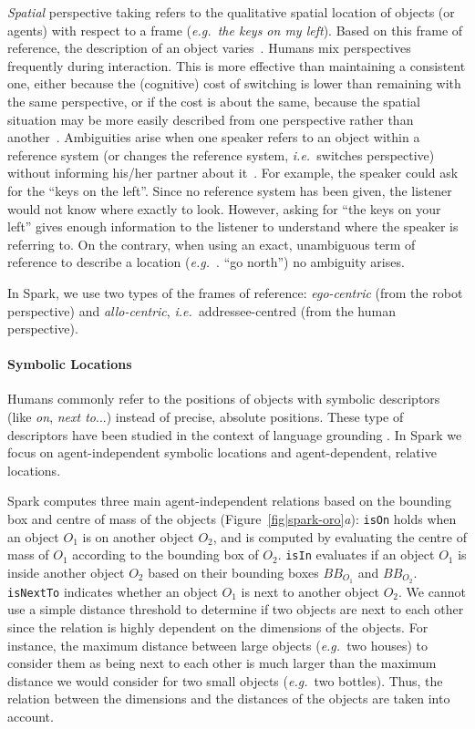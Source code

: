 \documentclass[preprint,3p,times]{elsarticle}
\newcommand{\concept}[1]{{\small \texttt{#1}}}
\newcommand{\ie}{{\textit{i.e.\ }}}
\newcommand{\eg}{{\textit{e.g.\ }}}
\begin{document}
\emph{Spatial} perspective taking refers to the qualitative spatial location of
objects (or agents) with respect to a frame (\eg \emph{the keys on my left}).
Based on this frame of reference, the description of an object
varies~\cite{Marin2008}. Humans mix perspectives frequently during interaction.
This is more effective than maintaining a consistent one, either because the
(cognitive) cost of switching is lower than remaining with the same
perspective, or if the cost is about the same, because the spatial situation
may be more easily described from one perspective rather than
another~\cite{Tversky1999}. Ambiguities arise when one speaker refers to an
object within a reference system (or changes the reference system, \ie switches
perspective) without informing his/her partner about it~\cite{Breazeal2006,
Ros2010}. For example, the speaker could ask for the ``keys on the left''.
Since no reference system has been given, the listener would not know where
exactly to look.  However, asking for ``the keys on your left'' gives enough
information to the listener to understand where the speaker is referring to. On
the contrary, when using an exact, unambiguous term of reference to describe a
location (\eg. ``go north'') no ambiguity arises.

In {\sc Spark}, we use two types of the frames of reference: \emph{ego-centric}
(from the robot perspective) and \emph{allo-centric}, \ie addressee-centred
(from the human perspective).

\paragraph{Symbolic Locations}

Humans commonly refer to the positions of objects with symbolic descriptors
(like \emph{on}, \emph{next to}...) instead of precise, absolute positions.
These type of descriptors have been studied in the context of language
grounding \cite{O'Keefe1999,Matuszek2010,Regier2001,Kelleher2006,Blisard2005}.
In {\sc Spark} we focus on agent-independent symbolic locations and agent-dependent,
relative locations.

{\sc Spark} computes three main agent-independent relations based on the
bounding box and centre of mass of the objects
(Figure~\ref{fig|spark-oro}\emph{a}): \concept{isOn} holds when an object $O_1$
is on another object $O_2$, and is computed by evaluating the centre of mass of
$O_1$ according to the bounding box of $O_2$.  \concept{isIn} evaluates if an
object $O_1$ is inside another object $O_2$ based on their bounding boxes
$BB_{O_1}$ and $BB_{O_2}$.  \concept{isNextTo} indicates whether an object $O_1$
is next to another object $O_2$. We cannot use a simple distance threshold to
determine if two objects are next to each other since the relation is highly
dependent on the dimensions of the objects. For instance, the maximum distance
between large objects (\eg two houses) to consider them as being next to each
other is much larger than the maximum distance we would consider for two small
objects (\eg two bottles). Thus, the relation between the dimensions and the
distances of the objects are taken into account.  
\end{document}

